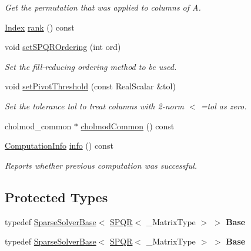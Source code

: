 \begin{DoxyCompactItemize}
\begin{DoxyCompactList}\small\item\em Get the permutation that was applied to columns of A. \end{DoxyCompactList}\item 
\hyperlink{namespace_eigen_a62e77e0933482dafde8fe197d9a2cfde}{Index} \hyperlink{class_eigen_1_1_s_p_q_r_a539b394ddb4894089e6634c744ea2ddc}{rank} () const
\item 
\mbox{\label{class_eigen_1_1_s_p_q_r_afa0db7888d808b453c23f62d62a4ad22}} 
void \hyperlink{class_eigen_1_1_s_p_q_r_afa0db7888d808b453c23f62d62a4ad22}{set\+S\+P\+Q\+R\+Ordering} (int ord)
\begin{DoxyCompactList}\small\item\em Set the fill-\/reducing ordering method to be used. \end{DoxyCompactList}\item 
\mbox{\label{class_eigen_1_1_s_p_q_r_ab7b42b75f621b0d4b5b0e090e23e2ce6}} 
void \hyperlink{class_eigen_1_1_s_p_q_r_ab7b42b75f621b0d4b5b0e090e23e2ce6}{set\+Pivot\+Threshold} (const Real\+Scalar \&tol)
\begin{DoxyCompactList}\small\item\em Set the tolerance tol to treat columns with 2-\/norm $<$ =tol as zero. \end{DoxyCompactList}\item 
cholmod\+\_\+common $\ast$ \hyperlink{class_eigen_1_1_s_p_q_r_a8c7d48d51a1fb08a3e27b8499e5c7f49}{cholmod\+Common} () const
\item 
\hyperlink{group__enums_ga85fad7b87587764e5cf6b513a9e0ee5e}{Computation\+Info} \hyperlink{class_eigen_1_1_s_p_q_r_a3ab7bacba8d2be20adc10b4d5b6c071f}{info} () const
\begin{DoxyCompactList}\small\item\em Reports whether previous computation was successful. \end{DoxyCompactList}\end{DoxyCompactItemize}
\subsection*{Protected Types}
\begin{DoxyCompactItemize}
\item 
\mbox{\label{class_eigen_1_1_s_p_q_r_a71bdab6a9a1a19479a93bc5d2ec732a1}} 
typedef \hyperlink{group___sparse_core___module_class_eigen_1_1_sparse_solver_base}{Sparse\+Solver\+Base}$<$ \hyperlink{class_eigen_1_1_s_p_q_r}{S\+P\+QR}$<$ \+\_\+\+Matrix\+Type $>$ $>$ {\bfseries Base}
\item 
\mbox{\label{class_eigen_1_1_s_p_q_r_a71bdab6a9a1a19479a93bc5d2ec732a1}} 
typedef \hyperlink{group___sparse_core___module_class_eigen_1_1_sparse_solver_base}{Sparse\+Solver\+Base}$<$ \hyperlink{class_eigen_1_1_s_p_q_r}{S\+P\+QR}$<$ \+\_\+\+Matrix\+Type $>$ $>$ {\bfseries Base}
\end{DoxyCompactItemize}

